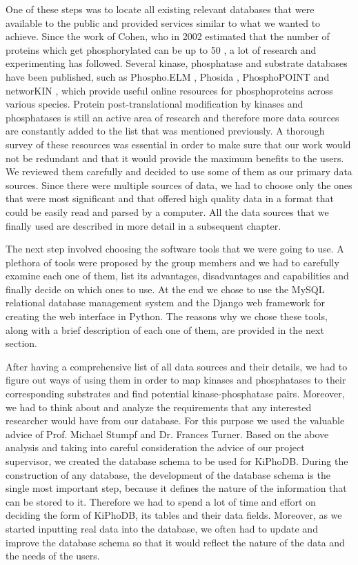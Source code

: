 One of these steps was to locate all existing relevant databases that were available to the public and provided services similar to what we wanted to achieve.
Since the work of Cohen, who in 2002 estimated that the number of proteins which get phosphorylated can be up to 50 \cite{phosphorylation_origins}, a lot of research and experimenting has followed.
Several kinase, phosphatase and substrate databases have been published, such as Phospho.ELM \cite{phosphoELM}, Phosida \cite{PHOSIDA}, PhosphoPOINT \cite{PhosphoPoint} and networKIN \cite{networKIN}, which provide useful online resources for phosphoproteins across various species.
Protein post-translational modification by kinases and phosphatases is still an active area of research and therefore more data sources are constantly added to the list that was mentioned previously.
A thorough survey of these resources was essential in order to make sure that our work would not be redundant and that it would provide the maximum benefits to the users.
We reviewed them carefully and decided to use some of them as our primary data sources.
Since there were multiple sources of data, we had to choose only the ones that were most significant and that offered high quality data in a format that could be easily read and parsed by a computer.
All the data sources that we finally used are described in more detail in a subsequent chapter.

The next step involved choosing the software tools that we were going to use.
A plethora of tools were proposed by the group members and we had to carefully examine each one of them, list its advantages, disadvantages and capabilities
and finally decide on which ones to use.
At the end we chose to use the MySQL relational database management system and the Django web framework for creating the web interface in Python.
The reasons why we chose these tools, along with a brief description of each one of them, are provided in the next section.

After having a comprehensive list of all data sources and their details, we had to figure out ways of using them in order to map kinases and phosphatases to their corresponding substrates and find potential kinase-phosphatase pairs.
Moreover, we had to think about and analyze the requirements that any interested researcher would have from our database.
For this purpose we used the valuable advice of Prof. Michael Stumpf and Dr. Frances Turner.
Based on the above analysis and taking into careful consideration the advice of our project supervisor, we created the database schema to be used for KiPhoDB.
During the construction of any database, the development of the database schema is the single most important step, because it defines the nature of the information that can be stored to it.
Therefore we had to spend a lot of time and effort on deciding the form of KiPhoDB, its tables and their data fields. 
Moreover, as we started inputting real data into the database, we often had to update and improve the database schema so that it would reflect the nature of the data and the needs of the users.


